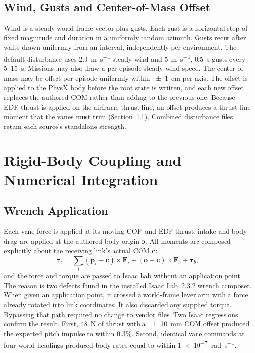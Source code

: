 \documentclass[journal]{IEEEtran}
\newcommand{\refsec}[1]{Section~\ref{#1}}
\newcommand{\vect}[1]{\bm{#1}}
\begin{document}
\subsection{Wind, Gusts and Center-of-Mass Offset}
\label{sec:disturbances}

Wind is a steady world-frame vector plus gusts.
Each gust is a horizontal step of fixed magnitude and duration in a uniformly random azimuth.
Gusts recur after waits drawn uniformly from an interval, independently per environment.
The default disturbance uses \SI{2.0}{\metre\per\second} steady wind and \SI{5}{\metre\per\second}, \SI{0.5}{\second} gusts every 5--\SI{15}{\second}.
Missions may also draw a per-episode steady wind speed.
The center of mass may be offset per episode uniformly within \SI{\pm1}{\centi\metre} per axis.
The offset is applied to the PhysX body before the root state is written, and each new offset replaces the authored COM rather than adding to the previous one.
Because EDF thrust is applied on the airframe thrust line, an offset produces a thrust-line moment that the vanes must trim (\refsec{sec:wrench}).
Combined disturbance files retain each source's standalone strength.

\section{Rigid-Body Coupling and Numerical Integration}
\label{sec:integration}

\subsection{Wrench Application}
\label{sec:wrench}

Each vane force is applied at its moving COP, and EDF thrust, intake and body drag are applied at the authored body origin $\vect{o}$.
All moments are composed explicitly about the receiving link's actual COM $\vect{c}$:
\begin{equation}
\vect{\tau}_c = \sum_i(\vect{p}_i - \vect{c})\times\vect{F}_i + (\vect{o} - \vect{c})\times\vect{F}_b + \vect{\tau}_b ,
\label{eq:wrench}
\end{equation}
and the force and torque are passed to Isaac Lab without an application point.
The reason is two defects found in the installed Isaac Lab~2.3.2 wrench composer.
When given an application point, it crossed a world-frame lever arm with a force already rotated into link coordinates.
It also discarded any supplied torque.
Bypassing that path required no change to vendor files.
Two Isaac regressions confirm the result.
First, \SI{48}{\newton} of thrust with a \SI{\pm10}{\milli\metre} COM offset produced the expected pitch impulse to within 0.3\%.
Second, identical vane commands at four world headings produced body rates equal to within \SI{1e-7}{\radian\per\second}.
\end{document}
